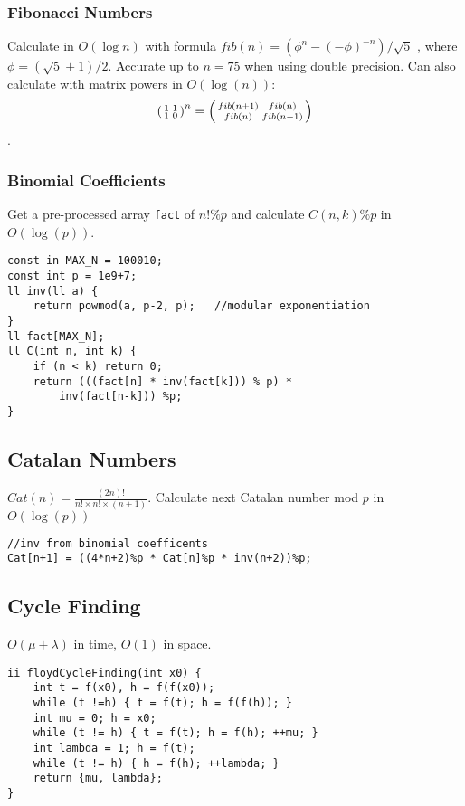 \documentclass[10pt]{article}{\twocolumn}
\newenvironment{psmallmatrix}
  {\left(\begin{smallmatrix}}
  {\end{smallmatrix}\right)}
\begin{document}
\subsubsection{Fibonacci Numbers}
Calculate in $O(\log{n})$ with formula $fib(n) = (\phi^n-(-\phi)^{-n}) / \sqrt{5}$
, where $\phi = (\sqrt{5} + 1) / 2$. Accurate up to $n = 75$ when using double precision.
Can also calculate with matrix powers in $O(\log(n))$: $$\begin{psmallmatrix}1 & 1\\1 & 0\end{psmallmatrix}^n = 
\begin{psmallmatrix}fib(n+1) & fib(n)\\fib(n) & fib(n - 1)\end{psmallmatrix}$$.

\subsubsection{Binomial Coefficients}
Get a pre-processed array \verb#fact# of $n!\%p$ and calculate $C(n,k)\%p$ in $O(\log(p))$. 
\begin{lstlisting}
const in MAX_N = 100010;
const int p = 1e9+7;
ll inv(ll a) {
    return powmod(a, p-2, p);   //modular exponentiation
}
ll fact[MAX_N];
ll C(int n, int k) {
    if (n < k) return 0;
    return (((fact[n] * inv(fact[k])) % p) * 
        inv(fact[n-k])) %p;
}
\end{lstlisting}

\subsection{Catalan Numbers}
$Cat(n) = \frac{(2n)!}{n! \times n! \times (n+1)}$. Calculate next Catalan 
number mod $p$ in $O(\log(p))$
\begin{lstlisting}
//inv from binomial coefficents
Cat[n+1] = ((4*n+2)%p * Cat[n]%p * inv(n+2))%p; 
\end{lstlisting}

\subsection{Cycle Finding}
$O(\mu + \lambda)$ in time, $O(1)$ in space. 
\begin{lstlisting}
ii floydCycleFinding(int x0) {
    int t = f(x0), h = f(f(x0));
    while (t !=h) { t = f(t); h = f(f(h)); }
    int mu = 0; h = x0;
    while (t != h) { t = f(t); h = f(h); ++mu; }
    int lambda = 1; h = f(t);
    while (t != h) { h = f(h); ++lambda; }
    return {mu, lambda};
}
\end{lstlisting}
\end{document}
